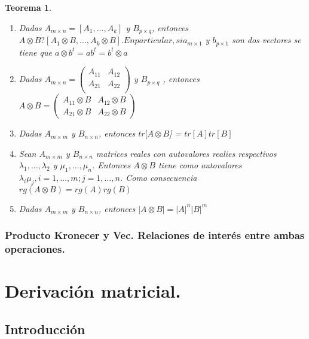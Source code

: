 \documentclass{article}
\theoremstyle{theorem-style}  %
\newtheorem{theorem}{Teorema}[section]  %
\theoremstyle{definition}
\theoremstyle{example-style}
\begin{document}
\begin{theorem}
\begin{enumerate}
			\item \textit{Dadas $A_{m \times n} = [A_1, ..., A_k]$ y $B_{p \times q}$, entonces $A \otimes B ? [A_1 \otimes B, ..., A_k \otimes B]. En particular, si a_{m \times 1}$ y $b_{p \times 1}$ son dos vectores se tiene que $a \otimes b^t = ab^t = b^t \otimes a$ }
			
			\item \textit{Dadas $A_{m \times n} =\left( {\begin{array}{cc}
						A_{11} & A_{12}\\
						A_{21} & A_{22}\\
				\end{array}}\right)$ 			 y $B_{p \times q}$ , entonces $A \otimes B = \left( {\begin{array}{cc}
					A_{11} \otimes B & A_{12} \otimes B\\
					A_{21}  \otimes B & A_{22} \otimes B
					\end{array}}\right)  $}
			
			\item \textit{Dadas $A_{m \times m}$ y $B_{n \times n}$, entonces $tr[A \otimes B$] = $tr[A]tr[B]$}
			
			\item \textit{Sean $A_{m \times m}$ y $B_{n \times n}$ matrices reales con autovalores realies respectivos $\lambda_1, ..., \lambda_2$ y $\mu_1, ..., \mu_n$. Entonces $A \otimes B$ tiene como autovalores $\lambda_i \mu_j, i = 1, ..., m; j = 1,...,n$. Como consecuencia $rg(A \otimes B) = rg(A)rg(B)$}
			
			\item \textit{Dadas $A_{m \times m }$ y $B_{n \times n}$, entonces $|A \otimes B| = |A|^n |B|^m$}
			
			
		\end{enumerate}
	\end{theorem}
	
	
\subsubsection{Producto Kronecer y Vec. Relaciones de interés entre ambas operaciones.}
	

\newpage
\section{Derivación matricial.}

\subsection{Introducción}
\end{document}
